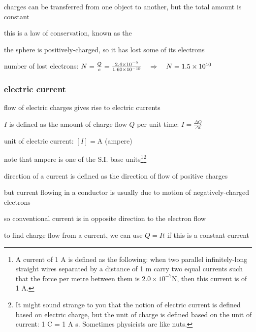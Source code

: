 charges can be transferred from one object to another, but the total amount is constant

this is a law of conservation, known as the 



\sol the sphere is positively-charged, so it has lost some of its electrons

number of lost electrons: $ N = \frac{Q}{e} = \frac{2.4\times10^{-9}}{1.60 \times10^{-19}} \quad \Rightarrow \quad N = 1.5 \times 10^{10}  $ \eoe



\subsubsection{electric current}

flow of electric charges gives rise to electric currents

\begin{ilight}
	\centering {} $I$ is defined as the amount of charge flow $Q$ per unit time: $ \boxed{I=\frac{\Delta Q}{\Delta t}} $
\end{ilight}


\cmt unit of electric current: $[I] = \text{A}$ (ampere)

note that ampere is one of the S.I. base units\footnote{A current of 1 A is defined as the following: when two parallel infinitely-long straight wires separated by a distance of 1 m carry two equal currents such that the force per metre between them is $2.0\times10^{-7}$N, then this current is of 1 A.}\footnote{It might sound strange to you that the notion of electric current is defined based on electric charge, but the unit of charge is defined based on the unit of current: 1 C = 1 A s. Sometimes physicists are like nuts.}

\cmt direction of a current is defined as the direction of flow of positive charges

but current flowing in a conductor is usually due to motion of negatively-charged electrons

so conventional current is in opposite direction to the electron flow

\cmt to find charge flow from a current, we can use  $Q=It$ if this is a constant current

